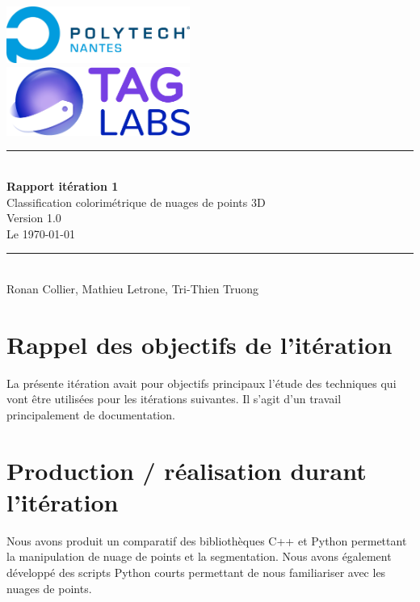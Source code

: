 \documentclass[12pt,titlepage,french]{article}
\begin{document}

\begin{titlepage}
\newcommand{\HRule}{\rule{\linewidth}{0.5mm}}
\center

  \includegraphics[width=0.45\textwidth]{../../ressources/img_logos/logo_polytech.png}\\[1cm]
   
  \includegraphics[width=0.45\textwidth]{../../ressources/img_logos/logo_taglabs.png}


\HRule \\[0.4cm]
{ \huge \bfseries Rapport itération 1\\[0.15cm] }
Classification colorimétrique de nuages de points 3D\\
Version 1.0\\
Le \today \\
\HRule \\[1.5cm]
Ronan Collier,
Mathieu Letrone,
Tri-Thien Truong
\\[1cm]
\end{titlepage}

\tableofcontents %
\newpage

\section{Rappel des objectifs de l'itération}
La présente itération avait pour objectifs principaux l'étude des techniques qui vont être utilisées pour les itérations suivantes.
Il s'agit d'un travail principalement de documentation.

\section{Production / réalisation durant l'itération}
Nous avons produit un comparatif des bibliothèques C++ et Python permettant la manipulation de nuage de points et la segmentation.
Nous avons également développé des scripts Python courts permettant de nous familiariser avec les nuages de points.
\end{document}
